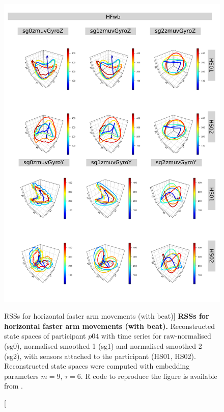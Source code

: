 \begin{figure}
\centering
\includegraphics[height=0.8\textheight]{rss_HFwb_p04}
\caption
	[RSSs for horizontal faster arm movements (with beat)]{
	{\bf RSSs for horizontal faster arm movements (with beat).}
	Reconstructed state spaces of participant $p04$
	with time series for raw-normalised (sg0), 
	normalised-smoothed 1 (sg1) and 
	normalised-smoothed 2 (sg2), 
	with sensors attached to the participant (HS01, HS02).
	Reconstructed state spaces were computed with 
	embedding parameters $m=9$, $\tau=6$.
	R code to reproduce the figure is available from \cite{xochicale2018}.
        }
     \label{fig:rss_HFwb_p04}
\end{figure}




